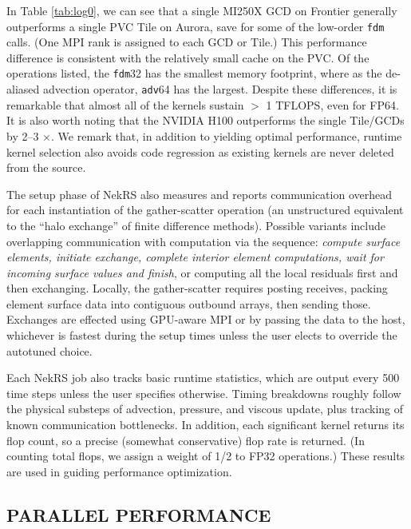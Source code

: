 In Table \ref{tab:log0}, we can see that a single MI250X GCD on Frontier
generally outperforms a single PVC Tile on Aurora, save for some of the
low-order {\tt fdm} calls.  (One MPI rank is assigned to each GCD or Tile.)
This performance difference is consistent with the relatively small cache
on the PVC.  Of the operations listed, the {\tt fdm}32 has the smallest
memory footprint, where as the de-aliased advection operator, {\tt adv}64
has the largest.  Despite these differences, it is remarkable that almost
all of the kernels sustain $>$ 1 TFLOPS, even for FP64.  It is also
worth noting that the NVIDIA H100 outperforms the single Tile/GCDs
by 2--3 $\times$.
%
We remark that, in addition to yielding optimal performance,
runtime kernel selection also avoids code regression as existing kernels
are never deleted from the source.

The setup phase of NekRS also measures and
reports communication overhead for each instantiation of the gather-scatter
operation (an unstructured equivalent to the ``halo exchange'' of finite
difference methods).  Possible variants include overlapping communication with
computation via the sequence: {\em compute surface elements, initiate exchange,
complete interior element computations, wait for incoming surface values and
finish}, or computing all the local residuals first and
then exchanging.  Locally, the gather-scatter requires posting receives,
packing element surface data into contiguous outbound arrays, then sending
those.  Exchanges are effected using GPU-aware MPI
or by passing the data to the host, whichever is fastest during the
setup times unless the user elects to override the autotuned choice.

Each NekRS job also tracks basic runtime statistics, which are output every 500
time steps unless the user specifies otherwise.  Timing breakdowns roughly
follow the physical substeps of advection, pressure, and viscous update, plus
tracking of known communication bottlenecks.  In addition, each significant
kernel returns its flop count, so a precise (somewhat conservative) flop rate
is returned.  (In counting total flops, we assign a weight of 1/2 to FP32
operations.) These results are used in guiding performance optimization.


\vspace{-.05in}
\subsection*{PARALLEL PERFORMANCE}
\vspace{-.0in}

